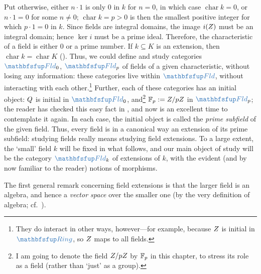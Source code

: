 Put otherwise, either $n \cdot 1$ is only $0$ in $k$ for $n = 0$, in
which case $\operatorname{char} k = 0$, or $n \cdot 1 = 0$ for some
$n \neq 0$; $\operatorname{char} k = p > 0$ is then the smallest
positive integer for which $p \cdot 1 = 0$ in $k$. Since fields are
integral domains, the image $i(Z)$ must be an integral domain; hence
$\ker i$ must be a prime ideal. Therefore, the characteristic of a
field is either $0$ or a prime number.  If $k \subseteq K$ is an
extension, then $\operatorname{char} k = \operatorname{char} K$
(). Thus, we could
define and study categories $\categ{Fld}_0$, $\categ{Fld}_p$ of fields
of a given characteristic, without losing any information: these
categories live within $\categ{Fld}$, without interacting with each
other.\footnote{They do interact in other ways, however---for example,
  because $Z$ is initial in $\categ{Ring}$, so $Z$ maps to all
  fields.} Further, each of these categories has an initial object:
$Q$ is initial in $\categ{Fld}_0$, and\footnote{I am going to denote
  the field $Z/pZ$ by $\mathbb{F}_p$ in this chapter, to stress its role as
  a field (rather than `just' as a group).}  $\mathbb{F}_p := Z/pZ$ in
$\categ{Fld}_p$; the reader has checked this easy fact in
, and now is an excellent
time to contemplate it again. In each case, the initial object is
called the \emph{prime subfield} of the given field. Thus, every field
is in a canonical way an extension of its prime subfield: studying
fields really means studying field extensions.  To a large extent, the
`small' field $k$ will be fixed in what follows, and our main object
of study will be the category $\categ{Fld}_k$ of extensions of $k$,
with the evident (and by now familiar to the reader) notions of
morphisms.

The first general remark concerning field extensions is that the
larger field is an algebra, and hence a \emph{vector space} over the
smaller one (by the very definition of algebra; cf.\
).

